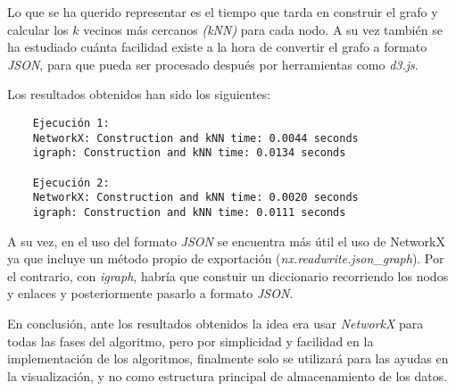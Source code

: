Lo que se ha querido representar es el tiempo que tarda en construir el grafo y calcular los $k$ vecinos más cercanos \textit{(kNN)} para cada nodo. A su vez también se ha estudiado cuánta facilidad existe a la hora de convertir el grafo a formato \textit{JSON}, para que pueda ser procesado después por herramientas como \textit{d3.js}.

Los resultados obtenidos han sido los siguientes:
\\
\begin{verbatim}
	Ejecución 1:
	NetworkX: Construction and kNN time: 0.0044 seconds
	igraph: Construction and kNN time: 0.0134 seconds
	
	Ejecución 2:
	NetworkX: Construction and kNN time: 0.0020 seconds
	igraph: Construction and kNN time: 0.0111 seconds
\end{verbatim}

A su vez, en el uso del formato \textit{JSON} se encuentra más útil el uso de NetworkX ya que incluye un método propio de exportación (\textit{nx.readwrite.json\_graph}).
Por el contrario, con \textit{igraph}, habría que constuir un diccionario recorriendo los nodos y enlaces y posteriormente pasarlo a formato \textit{JSON}.

En conclusión, ante los resultados obtenidos la idea era usar \textit{NetworkX} para todas las fases del algoritmo, pero por simplicidad y facilidad en la implementación de los algoritmos, finalmente solo se utilizará para las ayudas en la visualización, y no como estructura principal de almacenamiento de los datos.

